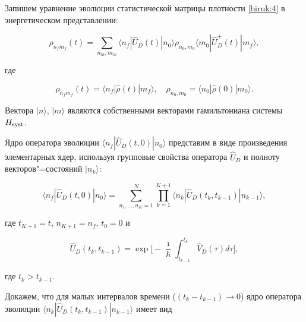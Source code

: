 Запишем уравнение эволюции статистической матрицы плотности \eqref{biruk:4} в энергетическом представлении:

\begin{equation}

\rho_{n_f m_f}(t)=\sum\limits_{n_{in},m_{in}}\langle n_{f}|\hat{U}_D(t)|n_{0}\rangle \rho_{n_{0},m_{0}} \langle m_{0} | \hat{U}_D^+(t)|m_{f} \rangle,

\label{biruk:13}

\end{equation}

где

$$

\rho_{n_f m_f}(t)=\langle n_{f}| \hat{\rho}(t) | m_{f} \rangle, \quad 

\rho_{n_{0},m_{0}}=\langle n_{0}| \hat{\rho}(0) | m_{0} \rangle.

$$

Вектора $|n\rangle$, $|m\rangle$ являются собственными векторами гамильтониана системы $H_{\rm syst}$.



Ядро оператора эволюции $\langle n_f| \hat{U}_D(t, 0)| n_{0}\rangle$ представим в виде произведения элементарных ядер, используя групповые свойства оператора $\hat{U}_D$ и полноту векторов"=состояний $|n_k\rangle$:

\begin{equation}

\langle n_f| \hat{U}_D(t, 0)| n_{0}\rangle =

\sum\limits_{n_{1},\dots, n_{K}=1}^{N}\prod\limits_{k=1}^{K+1}\langle n_k| \hat{U}_D(t_{k},t_{k-1})| n_{k-1}\rangle,

\label{biruk:14}

\end{equation}

где $t_{K+1}=t$, $n_{K+1}=n_f$, $t_{0}=0$ и

\begin{equation}

\hat{U}_D(t_{k},t_{k-1})=\exp\biggl[-\frac{\imath}{\hbar}\int_{t_{k-1}}^{t_{k}} \hat{V}_D(\tau) d\tau\biggr],

\label{biruk:15}

\end{equation}

где $t_{k}>t_{k-1}$.



Докажем, что для малых интервалов времени ($(t_k-t_{k-1})\rightarrow 0$) ядро оператора эволюции $\langle n_k| \hat{U}_D(t_{k},t_{k-1})| n_{k-1}\rangle$ имеет вид

